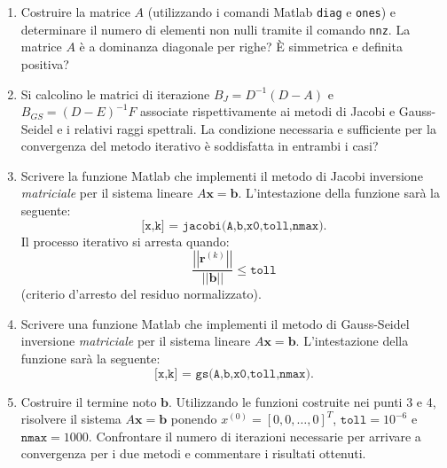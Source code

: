 \begin{enumerate}
    \item Costruire la matrice $A$ (utilizzando i comandi Matlab \texttt{diag} e \texttt{ones}) e determinare il numero di elementi non nulli tramite il comando \texttt{nnz}. La matrice $A$ è a dominanza diagonale per righe? È simmetrica e definita positiva?

    \item Si calcolino le matrici di iterazione $B_{J} = D^{-1}\left(D - A\right)$ e $B_{GS} = \left(D - E\right)^{-1}F$ associate rispettivamente ai metodi di Jacobi e Gauss-Seidel e i relativi raggi spettrali. La condizione necessaria e sufficiente per la convergenza del metodo iterativo è soddisfatta in entrambi i casi?

    \item Scrivere la funzione Matlab che implementi il metodo di Jacobi inversione \emph{matriciale} per il sistema lineare $A\mathbf{x} = \mathbf{b}$. L'intestazione della funzione sarà la seguente:
    \begin{equation*}
        \texttt{[x,k] = jacobi(A,b,x0,toll,nmax).}
    \end{equation*}
    Il processo iterativo si arresta quando:
    \begin{equation*}
        \dfrac{\left|\left|\mathbf{r}^{(k)}\right|\right|}{\left|\left|\mathbf{b}\right|\right|} \leq \texttt{toll}
    \end{equation*}
    (criterio d'arresto del residuo normalizzato).

    \item Scrivere una funzione Matlab che implementi il metodo di Gauss-Seidel inversione \emph{matriciale} per il sistema lineare $A\mathbf{x} = \mathbf{b}$. L'intestazione della funzione sarà la seguente:
    \begin{equation*}
        \texttt{[x,k] = gs(A,b,x0,toll,nmax).}
    \end{equation*}

    \item Costruire il termine noto $\mathbf{b}$. Utilizzando le funzioni costruite nei punti 3 e 4, risolvere il sistema $A\mathbf{x} = \mathbf{b}$ ponendo $x^{(0)} = \left[0,0,\dots,0\right]^{T}$, $\texttt{toll} = 10^{-6}$ e $\texttt{nmax} = 1000$. Confrontare il numero di iterazioni necessarie per arrivare a convergenza per i due metodi e commentare i risultati ottenuti.
\end{enumerate}
